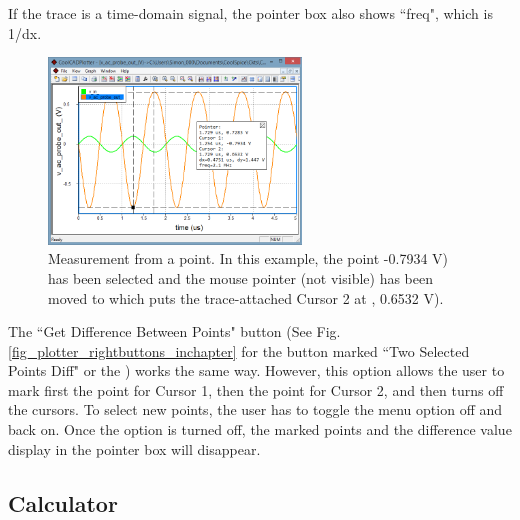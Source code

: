 If the trace is a time-domain signal, the pointer box also shows ``\textsf{freq}", which is 1/\textsf{dx}.

\begin{figure}
    \includegraphics[width=0.6\textwidth]{./figures/plotter_netlist_editor_figures/Plotter_DisplayDifference.png} %
    \caption{{Measurement from a point.  In this example, the point  -0.7934 V) has been selected and the mouse pointer (not visible) has been moved to  which puts the trace-attached Cursor 2 at , 0.6532 V).   }}
  \label{fig_plotter_distancefrompoint}
\end{figure}

The ``\textsf{Get Difference Between Points}" button (See Fig. \ref{fig_plotter_rightbuttons_inchapter} for the button marked ``Two Selected Points Diff" or the ) works the same way. However, this option allows the user to mark first the point for Cursor 1, then the point for Cursor 2, and then turns off the cursors.  To select new points, the user has to toggle the menu option off and back on.  Once the option is turned off, the marked points and the difference value display in the pointer box will disappear.

\subsection{Calculator}
\label{subsec_pane_calculator}

